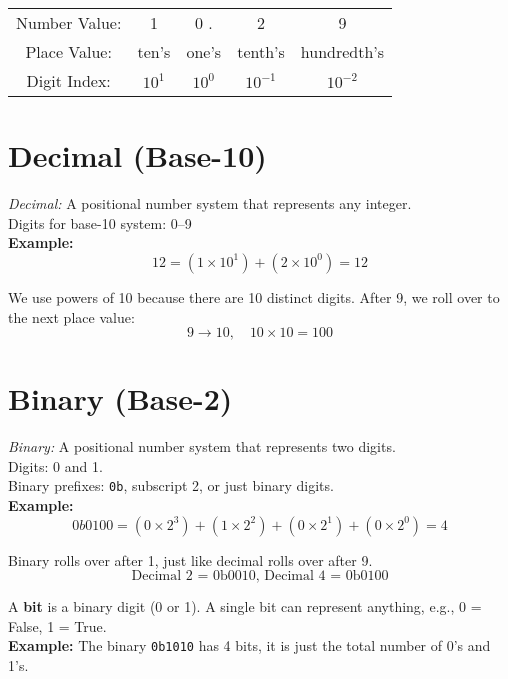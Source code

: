 \documentclass{article}
\begin{document}
\begin{center}
\begin{tabular}{c c c c c}
Number Value: & 1 & 0 . & 2 & 9 \\
Place Value:  & ten's & one's & tenth's & hundredth's \\
Digit Index:  & $10^1$ & $10^0$ & $10^{-1}$ & $10^{-2}$ \\
\end{tabular}
\end{center}




\section{Decimal (Base-10)}
\textit{Decimal:} A positional number system that represents any integer. \\

\noindent Digits for base-10 system: 0--9 \\

\textbf{Example:}
\[
12 = (1 \times 10^1) + (2 \times 10^0) = 12
\]

We use powers of 10 because there are 10 distinct digits. After 9, we roll over to the next place value:  
\[
9 \to 10, \quad 10 \times 10 = 100
\]

\section{Binary (Base-2)}
\textit{Binary:} A positional number system that represents two digits. \\

\noindent Digits: 0 and 1. \\

\noindent Binary prefixes: \texttt{0b}, subscript 2, or just binary digits. \\

\textbf{Example:}
\[
0b0100 = (0 \times 2^3) + (1 \times 2^2) + (0 \times 2^1) + (0 \times 2^0) = 4
\]

Binary rolls over after 1, just like decimal rolls over after 9.  
\[
\text{Decimal 2 = 0b0010, Decimal 4 = 0b0100}
\]

\noindent A \textbf{bit} is a binary digit (0 or 1). A single bit can represent anything, e.g., 0 = False, 1 = True. \\

\textbf{Example:}  
The binary \texttt{0b1010} has 4 bits, it is just the total number of 0's and 1's.
\end{document}
